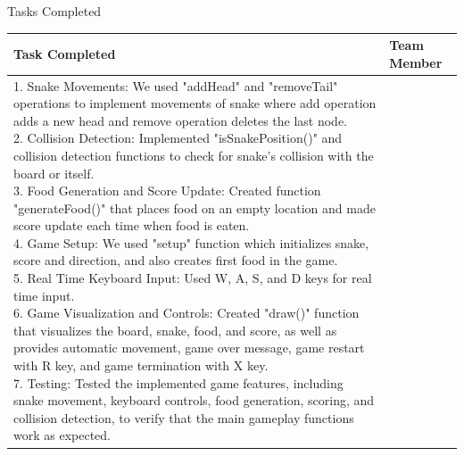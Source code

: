 \documentclass[12pt,a4paper]{article}
\newcommand{\sectiontitle}[1]{%
    {\color{GEUBlue}
    \fontsize{18}{22}\selectfont #1}
}
\begin{document}
\newpage


\vspace*{0.20cm}

\sectiontitle{Tasks Completed }

\vspace{0.05cm}

\vspace{0.20cm}

\begin{tabularx}{\textwidth}{
|>{\raggedright\arraybackslash}X
|>{\raggedright\arraybackslash}X|
}
\hline
\textbf{Task Completed} &
\textbf{Team Member}\\
\hline

\parbox[t][19.25cm][t]{\linewidth}{1. Snake Movements: We used "addHead" and "removeTail" operations to implement movements of snake where add operation adds a new head and remove operation deletes the last node.\\

2. Collision Detection: Implemented "isSnakePosition()" and collision detection functions to check for snake's collision with the board or itself.\\

3. Food Generation and Score Update: Created function "generateFood()" that places food on an empty location and made score update each time when food is eaten.\\

4. Game Setup: We used "setup" function which initializes snake, score and direction, and also creates first food in the game.\\

5. Real Time Keyboard Input: Used W, A, S, and D keys for real time input.\\

6. Game Visualization and Controls: Created "draw()" function that visualizes the board, snake, food, and score, as well as provides automatic movement, game over message, game restart with R key, and game termination with X key.\\

7. Testing: Tested the implemented game features, including snake movement, keyboard controls, food generation, scoring, and collision detection, to verify that the main gameplay functions work as expected.\\

}
\end{tabularx}
\end{document}
